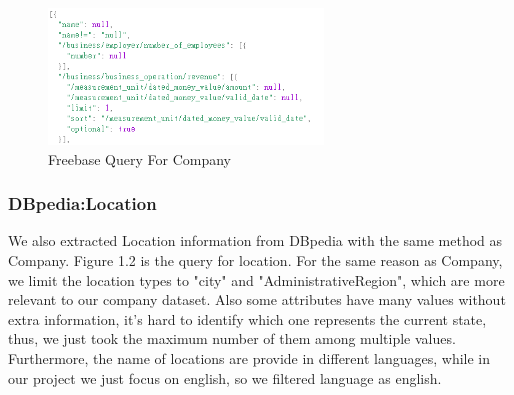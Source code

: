 \begin{figure}[H]
	\begin{center}
	\includegraphics[width=7.3cm]{Freebase_query}
	\caption[Freebase Query For Company]{Freebase Query For Company}
	\label{fig:db}
	\end{center}
\end{figure}

\subsubsection{DBpedia:Location}
We also extracted Location information from DBpedia with the same method as Company. Figure 1.2 is the query for location. For the same reason as Company, we limit the location types to "city" and "AdministrativeRegion", which are more relevant to our company dataset. Also some attributes have many values without extra information, it's hard to identify which one represents the current state, thus, we just took the maximum number of them among multiple values. Furthermore, the name of locations are provide in different languages, while in our project we just focus on english, so we filtered language as english.
